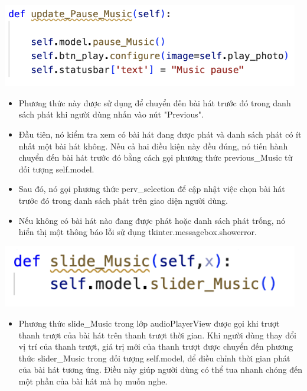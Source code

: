\documentclass[a4paper]{article}
\begin{document}
\begin{center}
\includegraphics[width=130mm]{template_SGU 2/audio_updatePause.png}
\end{center}
\begin{itemize}
    \item Phương thức này được sử dụng để chuyển đến bài hát trước đó trong danh sách phát khi người dùng nhấn vào nút "Previous".
    \item Đầu tiên, nó kiểm tra xem có bài hát đang được phát và danh sách phát có ít nhất một bài hát không. Nếu cả hai điều kiện này đều đúng, nó tiến hành chuyển đến bài hát trước đó bằng cách gọi phương thức previous\_Music từ đối tượng self.model.
    \item Sau đó, nó gọi phương thức perv\_selection để cập nhật việc chọn bài hát trước đó trong danh sách phát trên giao diện người dùng.
    \item Nếu không có bài hát nào đang được phát hoặc danh sách phát trống, nó hiển thị một thông báo lỗi sử dụng tkinter.messagebox.showerror.
\end{itemize}

\begin{center}
\includegraphics[width=130mm]{template_SGU 2/audio_slide.png}
\end{center}
\begin{itemize}
    \item Phương thức slide\_Music trong lớp audioPlayerView được gọi khi trượt thanh trượt của bài hát trên thanh trượt thời gian. Khi người dùng thay đổi vị trí của thanh trượt, giá trị mới của thanh trượt được chuyển đến phương thức slider\_Music trong đối tượng self.model, để điều chỉnh thời gian phát của bài hát tương ứng. Điều này giúp người dùng có thể tua nhanh chóng đến một phần của bài hát mà họ muốn nghe.
\end{itemize}
\end{document}
